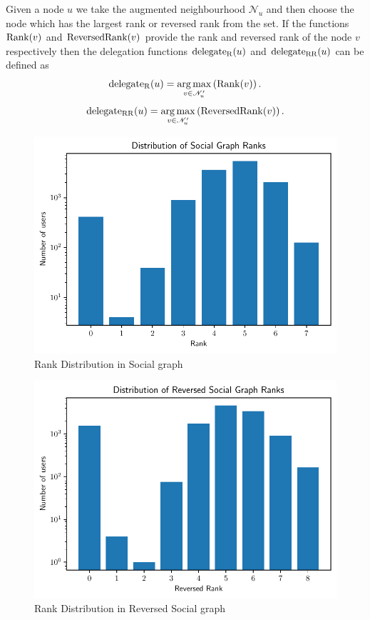 Given a node $u$ we take the augmented neighbourhood $\mathcal{N}_u$ and then choose the node which has the largest rank or reversed rank from the set. If the functions $\operatorname*{Rank}(v)$ and $\operatorname*{ReversedRank}(v)$ provide the rank and reversed rank of the node $v$ respectively then the delegation functions $\operatorname*{delegate_R}(u)$ and $\operatorname*{delegate_{RR}}(u)$ can be defined as 
\[\operatorname*{delegate_R}(u)  = \operatorname*{arg\,max}_{v \in \mathcal{N}_u^\prime} \left(\operatorname*{Rank}(v) \right).\]
\[\operatorname*{delegate_{RR}}(u)  = \operatorname*{arg\,max}_{v \in \mathcal{N}_u^\prime} \left(\operatorname*{ReversedRank}(v) \right).\]

\begin{figure}[!ht]
    \centering
    \includegraphics[width=\linewidth]{images/Rank dist.pdf}
    \caption{Rank Distribution in Social graph}
    \label{fig:rank}
\end{figure}
\begin{figure}[!ht]
    \centering
    \includegraphics[width=\linewidth]{images/Reversed Rank dist.pdf}
    \caption{Rank Distribution in Reversed Social graph}
    \label{fig:reversed-rank}
\end{figure}

